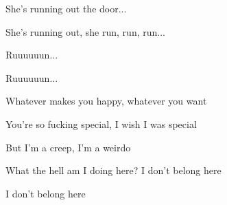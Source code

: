\begin{song}
\bigskip

She's running out the door... \par
{}She's running out, she run, run, run... \par
Ruuuuuun... \par
{}Ruuuuuun... \par

\bigskip

 \par
Whatever makes you happy, whatever you want \par
You're so fucking special, I wish I was special \par

\bigskip

But I'm a creep, I'm a weirdo \par
What the hell am I doing here? I don't belong here \par
I don't belong here \par

\end{song}
